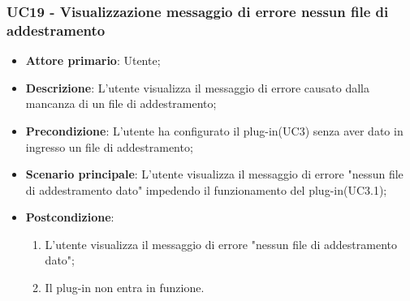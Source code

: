 \subsubsection{UC19 - Visualizzazione messaggio di errore nessun file di addestramento}
\label{sssec:uc19}
\begin{itemize}
  \item \textbf{Attore primario}: Utente;
  \item \textbf{Descrizione}: L'utente visualizza il messaggio di errore causato dalla mancanza di un file di addestramento;
  \item \textbf{Precondizione}: L'utente ha configurato il plug-in(UC3) senza aver dato in ingresso un file di addestramento;
  \item \textbf{Scenario principale}: L'utente visualizza il messaggio di errore "nessun file di addestramento dato" impedendo il funzionamento del plug-in(UC3.1);
  \item \textbf{Postcondizione}:
  \begin{enumerate}
		\item L'utente visualizza il messaggio di errore "nessun file di addestramento dato";
		\item Il plug-in non entra in funzione.
	\end{enumerate}
\end{itemize}
